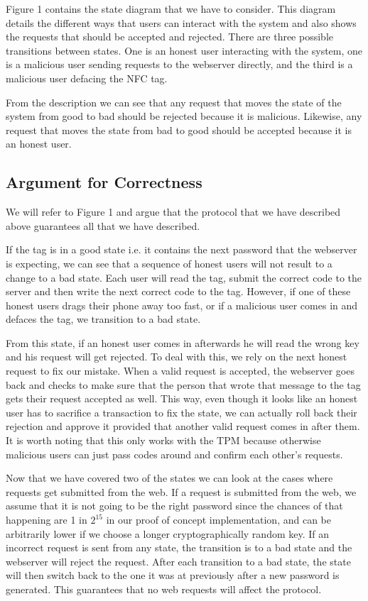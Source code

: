 \documentclass{sig-alternate}
\begin{document}
Figure 1 contains the state diagram that we have to consider. This
diagram details the different ways that users can interact with the
system and also shows the requests that should be accepted and
rejected. There are three possible transitions between states. One is
an honest user interacting with the system, one is a malicious user
sending requests to the webserver directly, and the third is a
malicious user defacing the NFC tag.

From the description we can see that any request that moves the state
of the system from good to bad should be rejected because it is
malicious. Likewise, any request that moves the state from bad to good
should be accepted because it is an honest user.

\subsection{Argument for Correctness}
We will refer to Figure 1 and argue that the protocol that we have
described above guarantees all that we have described.

If the tag is in a good state i.e. it contains the next password that
the webserver is expecting, we can see that a sequence of honest users
will not result to a change to a bad state. Each user will read the
tag, submit the correct code to the server and then write the next
correct code to the tag. However, if one of these honest users drags
their phone away too fast, or if a malicious user comes in and defaces
the tag, we transition to a bad state. 

From this state, if an honest user comes in afterwards he will read
the wrong key and his request will get rejected. To deal with this, we
rely on the next honest request to fix our mistake. When a valid
request is accepted, the webserver goes back and checks to make sure
that the person that wrote that message to the tag gets their request
accepted as well. This way, even though it looks like an honest user
has to sacrifice a transaction to fix the state, we can actually roll
back their rejection and approve it provided that another valid
request comes in after them. It is worth noting that this only works
with the TPM because otherwise malicious users can just pass codes
around and confirm each other's requests.

Now that we have covered two of the states we can look at the cases
where requests get submitted from the web. If a request is submitted
from the web, we assume that it is not going to be the right password
since the chances of that happening are 1 in $2^{15}$ in our proof of
concept implementation, and can be arbitrarily lower if we choose a
longer cryptographically random key. If an incorrect request is sent
from any state, the transition is to a bad state and the webserver
will reject the request. After each transition to a bad state, the
state will then switch back to the one it was at previously after a
new password is generated. This guarantees that no web requests will
affect the protocol.
\end{document}

